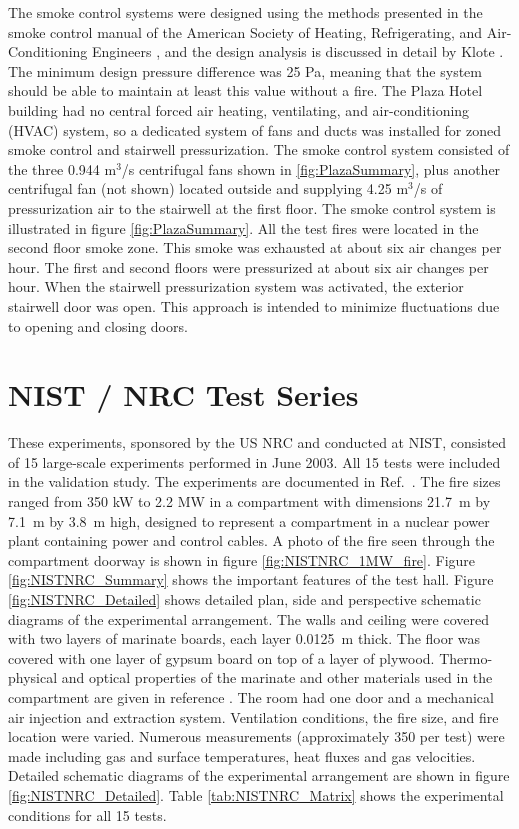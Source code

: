 The smoke control systems were designed using the methods presented in the smoke control manual of the American Society of Heating, Refrigerating, and Air-Conditioning Engineers \cite{Klote:1983}, and the design analysis is discussed in detail by Klote \cite{Klote:1988}. The minimum design pressure difference was 25 Pa, meaning that the system should be able to maintain at least this value without a fire. The Plaza Hotel building had no central forced air heating, ventilating, and air-conditioning (HVAC) system, so a dedicated system of fans and ducts was installed for zoned smoke control and stairwell pressurization. The smoke control system consisted of the three 0.944 m$^3$/s centrifugal fans shown in \ref{fig:PlazaSummary}, plus another centrifugal fan (not shown) located outside and supplying 4.25 m$^3$/s of pressurization air to the stairwell at the first floor. The smoke control system is illustrated in figure \ref{fig:PlazaSummary}. All the test fires were located in the second floor smoke zone. This smoke was exhausted at about six air changes per hour. The first and second floors were pressurized at about six air changes per hour. When the stairwell pressurization system was activated, the exterior stairwell door was open. This approach is intended to minimize fluctuations due to opening and closing doors.

\section{NIST / NRC Test Series}

These experiments, sponsored by the US NRC and conducted at NIST, consisted of 15 large-scale experiments performed in June 2003. All 15 tests were included in the validation study. The experiments are documented in Ref.~\cite{Hamins:2005}. The fire sizes ranged from 350 kW to 2.2 MW in a compartment with dimensions 21.7~m by 7.1~m by 3.8~m high, designed to represent a compartment in a nuclear power plant containing power and control cables. A photo of the fire seen through the compartment doorway is shown in figure \ref{fig:NISTNRC_1MW_fire}. Figure \ref{fig:NISTNRC_Summary} shows the important features of the test hall. Figure \ref{fig:NISTNRC_Detailed} shows detailed plan, side and perspective schematic diagrams of the experimental arrangement. The walls and ceiling were covered with two layers of marinate boards, each layer 0.0125~m thick. The floor was covered with one layer of gypsum board on top of a layer of plywood. Thermo-physical and optical properties of the marinate and other materials used in the compartment are given in reference \cite{Hamins:2005}. The room had one door and a mechanical air injection and extraction system. Ventilation conditions, the fire size, and fire location were varied. Numerous measurements (approximately 350 per test) were made including gas and surface temperatures, heat fluxes and gas velocities. Detailed schematic diagrams of the experimental arrangement are shown in figure \ref{fig:NISTNRC_Detailed}. Table \ref{tab:NISTNRC_Matrix} shows the experimental conditions for all 15 tests. 

